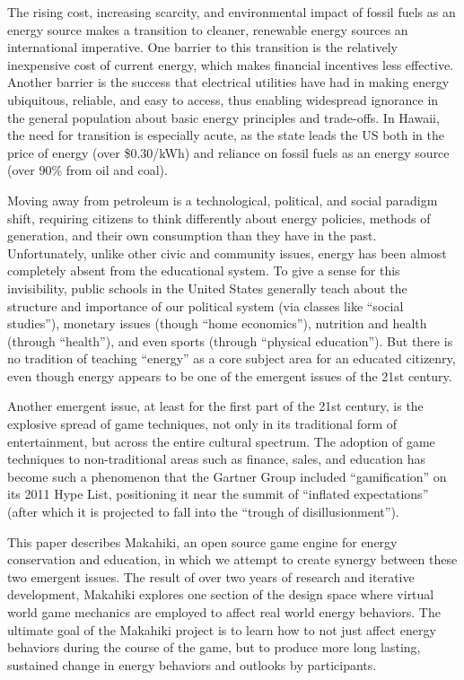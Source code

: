 \documentclass{acm_proc_article-sp}
\begin{document}
The rising cost, increasing scarcity, and environmental impact of fossil fuels
as an energy source makes a transition to cleaner, renewable energy sources an
international imperative.  One barrier to this transition is the relatively
inexpensive cost of current energy, which makes financial incentives less
effective. Another barrier is the success that electrical utilities have had in
making energy ubiquitous, reliable, and easy to access, thus enabling
widespread ignorance in the general population about basic energy principles
and trade-offs.  In Hawaii, the need for transition is especially acute, as the
state leads the US both in the price of energy (over \$0.30/kWh) and
reliance on fossil fuels as an energy source (over 90\% from oil and coal).

Moving away from petroleum is a technological, political, and social paradigm
shift, requiring citizens to think differently about energy policies, methods
of generation, and their own consumption than they have in the past. 
Unfortunately, unlike other civic and community issues, energy has been almost
completely absent from the educational system. To give a sense for this
invisibility, public schools in the United States generally teach about the
structure and importance of our political system (via classes like ``social
studies''), monetary issues (though ``home economics''), nutrition and health
(through ``health''), and even sports (through ``physical education'').  But
there is no tradition of teaching ``energy'' as a core subject area for an
educated citizenry, even though energy appears to be one of the emergent issues
of the 21st century.

Another emergent issue, at least for the first part of the 21st
century, is the explosive spread of game techniques, not only in its
traditional form of entertainment, but across the entire cultural spectrum.
The adoption of game techniques to non-traditional areas such as finance,
sales, and education has become such a phenomenon that the Gartner Group
included ``gamification'' \cite{Deterding2011mt} on its 2011 Hype List, 
positioning it near the summit of ``inflated expectations'' 
(after which it is projected to fall into the ``trough of disillusionment''). 

This paper describes Makahiki, an open source game engine for energy
conservation and education, in which we attempt to create synergy between
these two emergent issues.  The result of over two years of research and
iterative development, Makahiki explores one section of the design space
where virtual world game mechanics are employed to affect real world energy
behaviors.  The ultimate goal of the Makahiki project is to learn how to
not just affect energy behaviors during the course of the game, but to
produce more long lasting, sustained change in energy behaviors and
outlooks by participants. 
\end{document}
